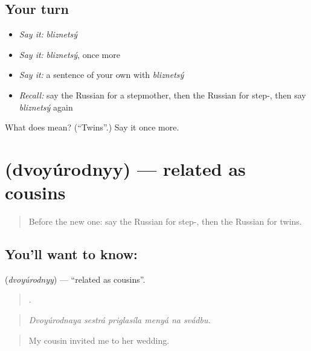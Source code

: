 \subsection*{Your turn}
\begin{itemize}
\raggedright
  \item \emph{Say it:} \emph{bliznetsý}
  \item \emph{Say it:} \emph{bliznetsý}, once more
  \item \emph{Say it:} a sentence of your own with \emph{bliznetsý}
  \item \emph{Recall:} say the Russian for a stepmother, then the Russian for step-, then say \emph{bliznetsý} again
\end{itemize}

\begin{tcolorbox}[breakable,colback=teal!4,colframe=teal!35!black,title={Before you move on}]
What does  mean? (\textquotedblleft{}Twins\textquotedblright{}.) Say it once more.
\end{tcolorbox}
\section[\texorpdfstring{\ru{двоюродный} (dvoyúrodnyy)}{двоюродный (dvoyúrodnyy)}]{ (dvoyúrodnyy) — related as cousins}

\label{lesson:RU-C492-dvoyurodnyy}



\begin{quote}
Before the new one: say the Russian for step-, then the Russian for twins.
\end{quote}

\subsection*{You'll want to know: }
\textbf{} (\emph{dvoyúrodnyy}) — \textquotedblleft{}related as cousins\textquotedblright{}.

\begin{quote}
     .
\end{quote}

\begin{quote}
\emph{Dvoyúrodnaya sestrá priglasíla menyá na svádbu.}
\end{quote}

\begin{quote}
My cousin invited me to her wedding.
\end{quote}

